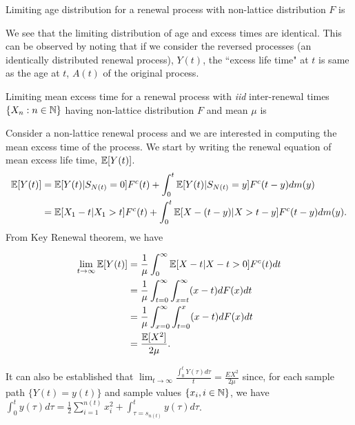 \documentclass[a4paper,10pt,english]{article}
\begin{document}
\begin{prop} 
Limiting age distribution for a renewal process with non-lattice distribution $F$ is 
\end{prop}
We see that the limiting distribution of age and excess times are identical. %
This can be observed by noting that if we consider the reversed processes (an identically distributed renewal process), $Y(t)$,  
the ``excess life time" at $t$ is same as the age at $t$, $A(t)$ of the original process.
\begin{cor}
Limiting mean excess time for a renewal process with \textit{iid} inter-renewal times $\{X_n: n \in \mathbb{N}\}$ having non-lattice distribution $F$ and mean $\mu$ is 
\end{cor}
Consider a non-lattice renewal process and we are interested in computing the mean excess time of the process. We start by writing the renewal equation of mean excess life time, $\mathbb{E}[Y(t)]$.
\begin{align*}
\mathbb{E}[Y(t)]&= \mathbb{E}[Y(t)|S_{N(t)}=0]F^c(t)+ \int_{0}^{t} \mathbb{E}[Y(t)|S_{N(t)}=y]F^c(t-y)dm(y)\\
&=\mathbb{E}[X_1-t |X_1>t]F^c(t)+ \int_{0}^{t} \mathbb{E}[X-(t-y)|X>t-y]F^c(t-y)dm(y).
\end{align*}
From Key Renewal theorem, we have 

\begin{align*}
\lim_{t \to \infty}\mathbb{E}[Y(t)]&=\frac{1}{\mu} \int_{0}^{\infty} \mathbb{E}[X-t|X-t >0]F^c(t) dt\\
&= \frac{1}{\mu} \int_{t=0}^{\infty} \int_{x=t}^{\infty}(x-t) dF(x) dt\\
&= \frac{1}{\mu} \int_{x=0}^{\infty} \int_{t=0}^{x}(x-t) dF(x) dt\\
&= \frac{\mathbb{E}[X^2]}{2\mu}.
\end{align*}

It can also be established that $\lim_{t\to \infty}\frac{\int_0^t Y(\tau) d\tau}{t} = \frac{EX^2}{2\mu}$ since, for each sample path $\{Y(t)= y(t)\}$ and sample values $\{x_i,i\in\mathbb{N}\}$, we have $\int_0^ty(\tau)d\tau = \frac{1}{2}\sum_{i=1}^{n(t)}x_i^2+\int_{\tau=s_{n(t)}}^t y(\tau)d\tau$.
\end{document}
